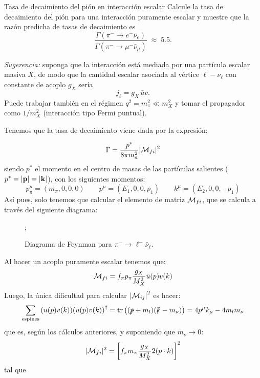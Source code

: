 

\begin{Ejercicio}{Tasa de decaimiento del pión en interacción escalar}\label{Ej:15}
	Calcule la tasa de decaimiento del pión para una interacción puramente escalar y muestre que la razón predicha de tasas de decaimiento es
	\[
		\frac{\Gamma(\pi^- \to e^- \bar{\nu}_e)}{\Gamma(\pi^- \to \mu^- \bar{\nu}_\mu)} \;\approx\; 5.5.
	\]

	\textit{Sugerencia:} suponga que la interacción está mediada por una partícula escalar masiva $X$, de modo que la cantidad escalar asociada al vértice $\ell-\nu_\ell$ con constante de acoplo $g_X$ sería
	\[
		j_\ell = g_X \, \bar{u} v.
	\]
	Puede trabajar también en el régimen $q^2 = m_\pi^2 \ll m_X^2$ y tomar el propagador como $1/m_X^2$ (interacción tipo Fermi puntual).
\end{Ejercicio}

Tenemos que la tasa de decaimiento viene dada por la expresión: 

\begin{equation}
    \Gamma = \frac{p^* }{8\pi m_a^2} |\mathcal{M}_{fi}|^2
\end{equation}
siendo $p^*$ el momento en el centro de masas de las partículas salientes ($p^*=|\mathbf{p}|=|\mathbf{k}|$), con los siguientes momentos:
\begin{equation}
    p_\pi^\mu = (m_\pi,0,0,0) \qquad p^\mu =(E_1,0,0,p_1) \qquad  k^\mu =(E_2,0,0,-p_1) 
\end{equation}
Así pues, solo tenemos que calcular el elemento de matriz $\mathcal{M}_{fi}$, que se calcula a través del siguiente diagrama:


\begin{figure}[h]
	\centering
	;
	\caption{Diagrama de Feynman para \(\pi^- \to \ell^- \bar{\nu}_\ell\).}
\end{figure}
Al hacer un acoplo puramente escalar tenemos que: 
\begin{equation}
    \mathcal{M}_{fi} = f_\pi p_\pi \frac{g_X}{M_X^2} \bar{u}(p) v(k)
\end{equation}
Luego, la única dificultad para calcular $\vqty{\Mcal_{ij}}^2$ es hacer: 
\begin{equation}
    \sum_{\text{espines}} \pqty{\bar{u}(p) v(k)}  \pqty{\bar{u}(p) v(k)}^\dagger = \tr \pqty{(\pslash+m_l)(\kslash-m_\nu)} = 4 p^\mu k_\mu - 4 m_l m_\nu 
\end{equation}
que es, según los cálculos anteriores, y suponiendo que $m_\nu \to 0$: 
\begin{equation}
    |\Mcal_{fi}|^2 = \bqty{f_\pi m_\pi \frac{g_X}{M_X^2} 2 (p \cdot k)}^2
\end{equation}
tal que 

